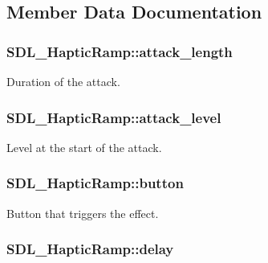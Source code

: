\subsection{Member Data Documentation}
\hypertarget{struct_s_d_l___haptic_ramp_adbcd7ffb05016d442c73e81cc0fcbbd2}{
\subsubsection[{attack\-\_\-length}]{ S\-D\-L\-\_\-\-Haptic\-Ramp\-::attack\-\_\-length}}\label{struct_s_d_l___haptic_ramp_adbcd7ffb05016d442c73e81cc0fcbbd2}
Duration of the attack. \hypertarget{struct_s_d_l___haptic_ramp_a755933bbda14ae9b53c574b9fe6291a0}{
\subsubsection[{attack\-\_\-level}]{ S\-D\-L\-\_\-\-Haptic\-Ramp\-::attack\-\_\-level}}\label{struct_s_d_l___haptic_ramp_a755933bbda14ae9b53c574b9fe6291a0}
Level at the start of the attack. \hypertarget{struct_s_d_l___haptic_ramp_a2027c6fd88f1ebe652c90c71410ee0bf}{
\subsubsection[{button}]{ S\-D\-L\-\_\-\-Haptic\-Ramp\-::button}}\label{struct_s_d_l___haptic_ramp_a2027c6fd88f1ebe652c90c71410ee0bf}
Button that triggers the effect. \hypertarget{struct_s_d_l___haptic_ramp_ac9471016f41919b4a1c786bbd649a777}{
\subsubsection[{delay}]{ S\-D\-L\-\_\-\-Haptic\-Ramp\-::delay}}\label{struct_s_d_l___haptic_ramp_ac9471016f41919b4a1c786bbd649a777}
